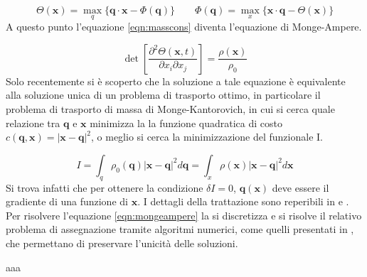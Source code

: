 \begin{equation}
    \Theta(\bm{x}) = \max_q \{\bm{q}\cdot\bm{x}-\Phi(\bm{q})\} \qquad \Phi(\bm{q}) = \max_x \{\bm{x}\cdot\bm{q}-\Theta(\bm{x})\}
\end{equation}
A questo punto l'equazione \ref{eqn:masscons} diventa l'equazione di Monge-Ampere.

\begin{equation}
    \det\left[\frac{\partial^2 \Theta (\bm{x}, t)}{\partial x_i \partial x_j}\right] = \frac{\rho(\bm{x})}{\rho_0}
\end{equation}
Solo recentemente si è scoperto che la soluzione a tale equazione è equivalente alla soluzione unica
di un problema di trasporto ottimo, in particolare il problema di trasporto di massa di Monge-Kantorovich,
in cui si cerca quale relazione tra $\bm{q}$ e $\bm{x}$ minimizza la la funzione quadratica di costo 
$c(\bm{q}, \bm{x}) = |\bm{x}-\bm{q}|^2$, o meglio si cerca la minimizzazione del funzionale I.

\begin{equation}
    \label{eqn:mongeampere}
    I = \int_q \rho_0(\bm{q})|\bm{x}-\bm{q}|^2 d\bm{q} = \int_x \rho(\bm{x})|\bm{x}-\bm{q}|^2 d\bm{x} 
\end{equation}
Si trova infatti che per ottenere la condizione $\delta I = 0$, $\bm{q}(\bm{x})$ deve essere il gradiente
di una funzione di $\bm{x}$. I dettagli della trattazione sono reperibili in \cite{mohayaee} e \cite{matarrese}.
Per risolvere l'equazione \ref{eqn:mongeampere} la si discretizza e si risolve il relativo problema di assegnazione 
tramite algoritmi numerici, come quelli presentati in \cite{mohayaee}, che permettano di preservare l'unicità
delle soluzioni.

aaa

